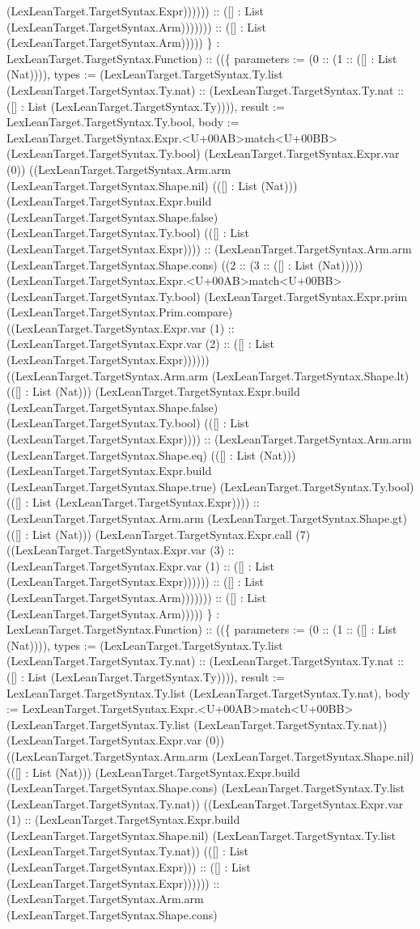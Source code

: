 \documentclass[11pt]{article}
\begin{document}
(LexLeanTarget.TargetSyntax.Expr)))))) :: ([] : List (LexLeanTarget.TargetSyntax.Arm))))))) :: ([] : List (LexLeanTarget.TargetSyntax.Arm))))) \} : LexLeanTarget.TargetSyntax.Function) :: ((\{ parameters := (0 :: (1 :: ([] : List (Nat)))), types := (LexLeanTarget.TargetSyntax.Ty.list (LexLeanTarget.TargetSyntax.Ty.nat) :: (LexLeanTarget.TargetSyntax.Ty.nat :: ([] : List (LexLeanTarget.TargetSyntax.Ty)))), result := LexLeanTarget.TargetSyntax.Ty.bool, body := LexLeanTarget.TargetSyntax.Expr.<U+00AB>match<U+00BB> (LexLeanTarget.TargetSyntax.Ty.bool) (LexLeanTarget.TargetSyntax.Expr.var (0)) ((LexLeanTarget.TargetSyntax.Arm.arm (LexLeanTarget.TargetSyntax.Shape.nil) (([] : List (Nat))) (LexLeanTarget.TargetSyntax.Expr.build (LexLeanTarget.TargetSyntax.Shape.false) (LexLeanTarget.TargetSyntax.Ty.bool) (([] : List (LexLeanTarget.TargetSyntax.Expr)))) :: (LexLeanTarget.TargetSyntax.Arm.arm (LexLeanTarget.TargetSyntax.Shape.cons) ((2 :: (3 :: ([] : List (Nat))))) (LexLeanTarget.TargetSyntax.Expr.<U+00AB>match<U+00BB> (LexLeanTarget.TargetSyntax.Ty.bool) (LexLeanTarget.TargetSyntax.Expr.prim (LexLeanTarget.TargetSyntax.Prim.compare) ((LexLeanTarget.TargetSyntax.Expr.var (1) :: (LexLeanTarget.TargetSyntax.Expr.var (2) :: ([] : List (LexLeanTarget.TargetSyntax.Expr)))))) ((LexLeanTarget.TargetSyntax.Arm.arm (LexLeanTarget.TargetSyntax.Shape.lt) (([] : List (Nat))) (LexLeanTarget.TargetSyntax.Expr.build (LexLeanTarget.TargetSyntax.Shape.false) (LexLeanTarget.TargetSyntax.Ty.bool) (([] : List (LexLeanTarget.TargetSyntax.Expr)))) :: (LexLeanTarget.TargetSyntax.Arm.arm (LexLeanTarget.TargetSyntax.Shape.eq) (([] : List (Nat))) (LexLeanTarget.TargetSyntax.Expr.build (LexLeanTarget.TargetSyntax.Shape.true) (LexLeanTarget.TargetSyntax.Ty.bool) (([] : List (LexLeanTarget.TargetSyntax.Expr)))) :: (LexLeanTarget.TargetSyntax.Arm.arm (LexLeanTarget.TargetSyntax.Shape.gt) (([] : List (Nat))) (LexLeanTarget.TargetSyntax.Expr.call (7) ((LexLeanTarget.TargetSyntax.Expr.var (3) :: (LexLeanTarget.TargetSyntax.Expr.var (1) :: ([] : List (LexLeanTarget.TargetSyntax.Expr)))))) :: ([] : List (LexLeanTarget.TargetSyntax.Arm))))))) :: ([] : List (LexLeanTarget.TargetSyntax.Arm))))) \} : LexLeanTarget.TargetSyntax.Function) :: ((\{ parameters := (0 :: (1 :: ([] : List (Nat)))), types := (LexLeanTarget.TargetSyntax.Ty.list (LexLeanTarget.TargetSyntax.Ty.nat) :: (LexLeanTarget.TargetSyntax.Ty.nat :: ([] : List (LexLeanTarget.TargetSyntax.Ty)))), result := LexLeanTarget.TargetSyntax.Ty.list (LexLeanTarget.TargetSyntax.Ty.nat), body := LexLeanTarget.TargetSyntax.Expr.<U+00AB>match<U+00BB> (LexLeanTarget.TargetSyntax.Ty.list (LexLeanTarget.TargetSyntax.Ty.nat)) (LexLeanTarget.TargetSyntax.Expr.var (0)) ((LexLeanTarget.TargetSyntax.Arm.arm (LexLeanTarget.TargetSyntax.Shape.nil) (([] : List (Nat))) (LexLeanTarget.TargetSyntax.Expr.build (LexLeanTarget.TargetSyntax.Shape.cons) (LexLeanTarget.TargetSyntax.Ty.list (LexLeanTarget.TargetSyntax.Ty.nat)) ((LexLeanTarget.TargetSyntax.Expr.var (1) :: (LexLeanTarget.TargetSyntax.Expr.build (LexLeanTarget.TargetSyntax.Shape.nil) (LexLeanTarget.TargetSyntax.Ty.list (LexLeanTarget.TargetSyntax.Ty.nat)) (([] : List (LexLeanTarget.TargetSyntax.Expr))) :: ([] : List (LexLeanTarget.TargetSyntax.Expr)))))) :: (LexLeanTarget.TargetSyntax.Arm.arm (LexLeanTarget.TargetSyntax.Shape.cons) 
\end{document}
